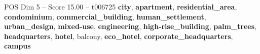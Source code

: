 \begin{textsample}{POS Dim 5 – Score 15.00 – t006725}  \label{ex:f5_pos_034}
\textbf{city}, \textbf{apartment}, \textbf{residential\_area}, \textbf{condominium}, \textbf{commercial\_building}, \textbf{human\_settlement}, \textbf{urban\_design}, \textbf{mixed-use}, \textbf{engineering}, \textbf{high-rise\_building}, \textbf{palm\_trees}, \textbf{headquarters}, \textbf{hotel}, balcony, \textbf{eco\_hotel}, \textbf{corporate\_headquarters}, \textbf{campus}

\end{textsample}
